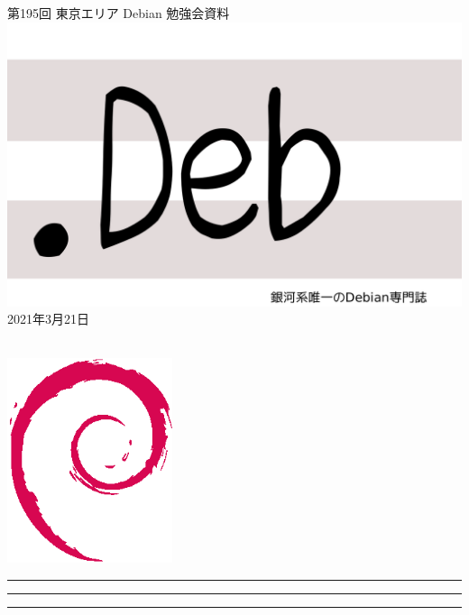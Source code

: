 \documentclass[mingoth,a4paper]{jsarticle}
\newcommand{\debmtgyear}{2021}
\newcommand{\debmtgmonth}{3}
\newcommand{\debmtgdate}{21}
\newcommand{\debmtgnumber}{195}
\begin{document}
\begin{titlepage}
\thispagestyle{empty}

\vspace*{-2cm}
第\debmtgnumber{}回 東京エリア Debian 勉強会資料\\
\hspace*{-2cm}
\includegraphics{image-assets/dotdeb.pdf}\\
\hfill{}\debmtgyear{}年\debmtgmonth{}月\debmtgdate{}日

\\

\vspace*{-2cm}
\hfill{}\includegraphics[height=6cm]{image-assets/openlogo-nd.eps}
\end{titlepage}

\newpage

\begin{minipage}[b]{0.2\hsize}
 \colorbox{titleback}{}
\end{minipage}
\begin{minipage}[b]{0.8\hsize}
\hrule
\vspace{2mm}
\hrule
\begin{multicols}{2}
\tableofcontents
\end{multicols}
\vspace{2mm}
\hrule
\end{minipage}
\end{document}
